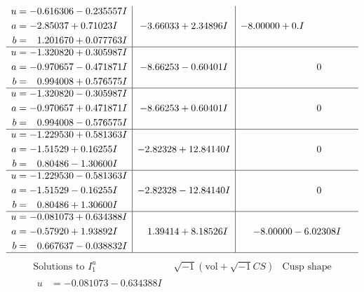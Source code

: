 \documentclass[1p]{elsarticle_modified}
\theoremstyle{definition}
\newcommand{\I}{\sqrt{-1}}
\begin{document}
$$\begin{array}{c|c|c}
\begin{aligned}
u &= -0.616306 - 0.235557 I \\
a &= -2.85037 + 0.71023 I \\
b &= \phantom{-}1.201670 + 0.077763 I\end{aligned}
 & -3.66033 + 2.34896 I & -8.00000 + 0. I\phantom{ +0.000000I} \\ \hline\begin{aligned}
u &= -1.320820 + 0.305987 I \\
a &= -0.970657 - 0.471871 I \\
b &= \phantom{-}0.994008 + 0.576575 I\end{aligned}
 & -8.66253 - 0.60401 I & \phantom{-0.000000 } 0 \\ \hline\begin{aligned}
u &= -1.320820 - 0.305987 I \\
a &= -0.970657 + 0.471871 I \\
b &= \phantom{-}0.994008 - 0.576575 I\end{aligned}
 & -8.66253 + 0.60401 I & \phantom{-0.000000 } 0 \\ \hline\begin{aligned}
u &= -1.229530 + 0.581363 I \\
a &= -1.51529 + 0.16255 I \\
b &= \phantom{-}0.80486 - 1.30600 I\end{aligned}
 & -2.82328 + 12.84140 I & \phantom{-0.000000 } 0 \\ \hline\begin{aligned}
u &= -1.229530 - 0.581363 I \\
a &= -1.51529 - 0.16255 I \\
b &= \phantom{-}0.80486 + 1.30600 I\end{aligned}
 & -2.82328 - 12.84140 I & \phantom{-0.000000 } 0 \\ \hline\begin{aligned}
u &= -0.081073 + 0.634388 I \\
a &= -0.57920 + 1.93892 I \\
b &= \phantom{-}0.667637 - 0.038832 I\end{aligned}
 & \phantom{-}1.39414 + 8.18526 I & -8.00000 - 6.02308 I\\
 \hline 
 \end{array}$$\newpage$$\begin{array}{c|c|c}  
\text{Solutions to }I^u_{1}& \I (\text{vol} + \sqrt{-1}CS) & \text{Cusp shape}\\
 \hline 
\begin{aligned}
u &= -0.081073 - 0.634388 I \\

\end{aligned}
\end{array}$$
\end{document}
